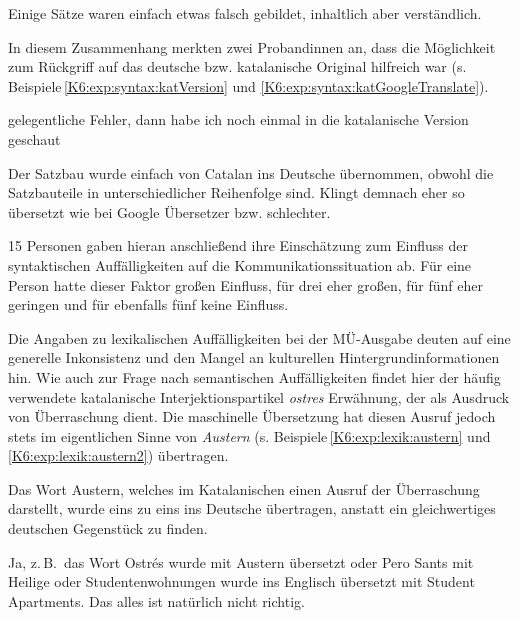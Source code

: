 \begin{example}
	\label{K6:exp:syntax:satzbildung}
	Einige Sätze waren einfach etwas falsch gebildet, inhaltlich aber verständlich.
\end{example}


In diesem Zusammenhang merkten zwei Proband{\textperiodcentered}innen an, dass die Möglichkeit zum Rückgriff auf das deutsche bzw. katalanische Original hilfreich war (s. Beispiele\,\ref{K6:exp:syntax:katVersion} und \ref{K6:exp:syntax:katGoogleTranslate}).

\begin{example}
	\label{K6:exp:syntax:katVersion}
	gelegentliche Fehler, dann habe ich noch einmal in die katalanische Version geschaut
\end{example}


\begin{example}
	\label{K6:exp:syntax:katGoogleTranslate}
	Der Satzbau wurde einfach von Catalan ins Deutsche übernommen, obwohl die Satzbauteile in unterschiedlicher Reihenfolge sind. Klingt demnach eher so übersetzt wie bei Google Übersetzer bzw. schlechter.
\end{example}

15 Personen gaben hieran anschließend ihre Einschätzung zum Einfluss der syntaktischen Auffälligkeiten auf die Kommunikationssituation ab. Für eine Person hatte dieser Faktor großen Einfluss, für drei eher großen, für fünf eher geringen und für ebenfalls fünf keine Einfluss.

Die Angaben zu lexikalischen Auffälligkeiten bei der MÜ-Ausgabe deuten auf eine generelle Inkonsistenz und den Mangel an kulturellen Hintergrundinformationen hin. Wie auch zur Frage nach semantischen Auffälligkeiten findet hier der häufig verwendete katalanische Interjektionspartikel \emph{ostres} Erwähnung, der als Ausdruck von Überraschung dient. Die maschinelle Übersetzung hat diesen Ausruf jedoch stets im eigentlichen Sinne von \emph{Austern} (s. Beispiele\,\ref{K6:exp:lexik:austern} und \ref{K6:exp:lexik:austern2}) übertragen. 

\begin{example}
	\label{K6:exp:lexik:austern}
	Das Wort \glqq Austern\grqq, welches im Katalanischen einen Ausruf der Überraschung darstellt, wurde eins zu eins ins Deutsche übertragen, anstatt ein gleichwertiges deutschen Gegenstück zu finden.
\end{example}

\begin{example}
	\label{K6:exp:lexik:austern2}
	Ja, z.\,B.\ das Wort Ostrés wurde mit Austern übersetzt oder Pero Sants mit Heilige oder Studentenwohnungen wurde ins Englisch übersetzt mit Student Apartments. Das alles ist natürlich nicht richtig. 
\end{example}

